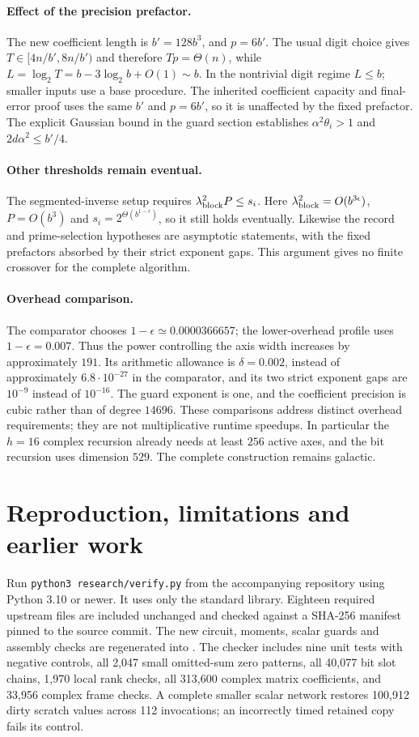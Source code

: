 \paragraph{Effect of the precision prefactor.}
The new coefficient length is $b'=128b^3$, and $p=6b'$.
The usual digit choice gives $T\in[4n/b',8n/b')$ and therefore
$Tp=\Theta(n)$, while
$L=\log_2T=b-3\log_2b+O(1)\sim b$.
In the nontrivial digit regime $L\le b$; smaller inputs use a base procedure.
The inherited coefficient capacity and final-error proof uses the same
$b'$ and $p=6b'$, so it is unaffected by the fixed prefactor.
The explicit Gaussian bound in the guard section establishes
$\alpha^2\theta_i>1$ and $2d\alpha^2\le b'/4$.

\paragraph{Other thresholds remain eventual.}
The segmented-inverse setup requires $\lambda_{\rm block}^2P\le s_i$.
Here $\lambda_{\rm block}^2=O(b^{3\epsilon})$, $P=O(b^3)$ and
$s_i=2^{\Theta(b^{1-\epsilon})}$, so it still holds eventually.
Likewise the record and prime-selection hypotheses are asymptotic statements,
with the fixed prefactors absorbed by their strict exponent gaps.
This argument gives no finite crossover for the complete algorithm.

\paragraph{Overhead comparison.}
The comparator chooses $1-\epsilon\simeq0.0000366657$;
the lower-overhead profile uses $1-\epsilon=0.007$.
Thus the power controlling the axis width increases by approximately $191$.
Its arithmetic allowance is $\delta=0.002$, instead of approximately
$6.8\cdot10^{-27}$ in the comparator, and its two strict exponent gaps are
$10^{-9}$ instead of $10^{-16}$.
The guard exponent is one, and the coefficient precision is cubic rather than
of degree $14696$. These comparisons address distinct overhead requirements;
they are not multiplicative runtime speedups. In particular the $h=16$
complex recursion already needs at least $256$ active axes, and the bit
recursion uses dimension $529$. The complete construction remains galactic.

\section{Reproduction, limitations and earlier work}
Run \texttt{python3 research/verify.py} from the accompanying repository using
Python 3.10 or newer. It uses only the standard library. Eighteen required
upstream files are included unchanged and checked against a SHA-256 manifest
pinned to the source commit. The new circuit, moments, scalar guards and
assembly checks are regenerated into .
The checker includes nine unit tests with negative controls, all 2,047 small
omitted-sum zero patterns, all 40,077 bit slot chains, 1,970 local rank checks,
all 313,600 complex matrix coefficients, and 33,956 complex frame checks.
A complete smaller scalar network restores 100,912 dirty scratch values
across 112 invocations; an incorrectly timed retained copy fails its control.

